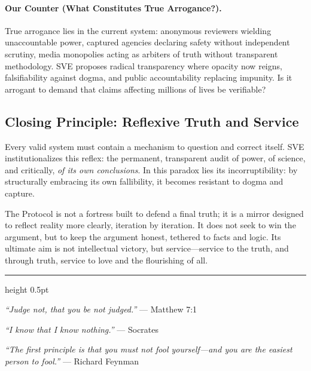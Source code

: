 \documentclass[11pt,a4paper]{article}
\theoremstyle{definition}
\begin{document}
\begin{small}
\paragraph{\textbf{Our Counter (What Constitutes True Arrogance?).}} True arrogance lies in the current system: anonymous reviewers wielding unaccountable power, captured agencies declaring safety without independent scrutiny, media monopolies acting as arbiters of truth without transparent methodology. SVE proposes radical transparency where opacity now reigns, falsifiability against dogma, and public accountability replacing impunity. Is it arrogant to demand that claims affecting millions of lives be verifiable?

\vspace{1.5em}

\subsection*{\textcolor{headercolor}{Closing Principle: Reflexive Truth and Service}}

Every valid system must contain a mechanism to question and correct itself. SVE institutionalizes this reflex: the permanent, transparent audit of power, of science, and critically, \textit{of its own conclusions}. In this paradox lies its incorruptibility: by structurally embracing its own fallibility, it becomes resistant to dogma and capture.

The Protocol is not a fortress built to defend a final truth; it is a mirror designed to reflect reality more clearly, iteration by iteration. It does not seek to win the argument, but to keep the argument honest, tethered to facts and logic. Its ultimate aim is not intellectual victory, but service—service to the truth, and through truth, service to love and the flourishing of all.

\vspace{2em}

\begin{center}
\begin{minipage}{0.9\textwidth}
\hrule height 0.5pt
\vspace{1em}

\noindent\textit{``Judge not, that you be not judged.''} --- Matthew 7:1

\vspace{0.6em}
\noindent\textit{``I know that I know nothing.''} --- Socrates

\vspace{0.6em}
\noindent\textit{``The first principle is that you must not fool yourself—and you are the easiest person to fool.''} --- Richard Feynman


\end{minipage}
\end{center}
\end{small}
\end{document}
